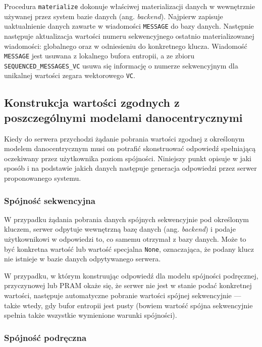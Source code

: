 Procedura \texttt{materialize} dokonuje właściwej materializacji danych w wewnętrznie używanej przez system bazie danych (ang. \textit{backend}). Najpierw zapisuje uaktualnienie danych zawarte w wiadomości \texttt{MESSAGE} do bazy danych. Następnie następuje aktualizacja wartości numeru sekwencyjnego ostatnio materializowanej wiadomości: globalnego oraz w odniesieniu do konkretnego klucza. Wiadomość \texttt{MESSAGE} jest usuwana z lokalnego bufora entropii, a ze zbioru \texttt{SEQUENCED\_MESSAGES\_VC} usuwa się informację o numerze sekwencyjnym dla unikalnej wartości zegara wektorowego \texttt{VC}.

\subsection{Konstrukcja wartości zgodnych z poszczególnymi modelami danocentrycznymi} \label{section:value_construction}

Kiedy do serwera przychodzi żądanie pobrania wartości zgodnej z określonym modelem danocentrycznym musi on potrafić skonstruować odpowiedź spełniającą oczekiwany przez użytkownika poziom spójności. Niniejszy punkt opisuje w jaki sposób i na podstawie jakich danych następuje generacja odpowiedzi przez serwer proponowanego systemu. 

\subsubsection{Spójność sekwencyjna}

W przypadku żądania pobrania danych spójnych sekwencyjnie pod określonym kluczem, serwer odpytuje wewnętrzną bazę danych (ang. \textit{backend}) i podaje użytkownikowi w odpowiedzi to, co samemu otrzymał z bazy danych. Może to być konkretna wartość lub wartość specjalna \texttt{None}, oznaczająca, że podany klucz nie istnieje w bazie danych odpytywanego serwera.

W przypadku, w którym konstruując odpowiedź dla modelu spójności podręcznej, przyczynowej lub PRAM okaże się, że serwer nie jest w stanie podać konkretnej wartości, następuje automatyczne pobranie wartości spójnej sekwencyjnie --- także wtedy, gdy bufor entropii jest pusty (bowiem wartość spójna sekwencyjnie spełnia także wszystkie wymienione warunki spójności).

\subsubsection{Spójność podręczna}

